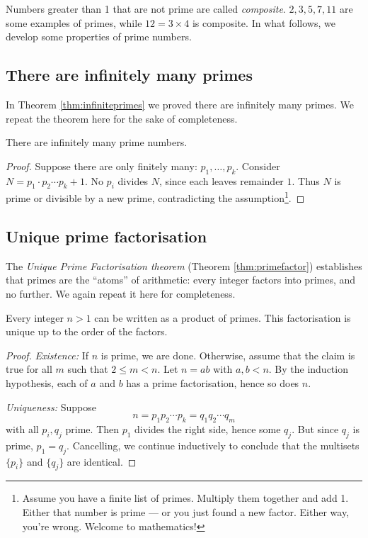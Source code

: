 Numbers greater than 1 that are not prime are called \emph{composite}.  
$2,3,5,7,11$ are some examples of primes, while $12=3 \times 4$ is composite.  In what follows, we develop some properties of prime numbers.

\subsection{There are infinitely many primes}

In Theorem \ref{thm:infiniteprimes} we proved there are infinitely many primes. We repeat the theorem here for the sake of completeness.

\begin{theorem}[Euclid]
There are infinitely many prime numbers.
\end{theorem}
\begin{proof}
Suppose there are only finitely many: $p_1,\dots,p_k$. 
Consider $N=p_1\cdot p_2\cdots p_k+1$. 
No $p_i$ divides $N$, since each leaves remainder $1$. 
Thus $N$ is prime or divisible by a new prime, contradicting the assumption\footnote{Assume you have a finite list of primes. Multiply them together and add 1. Either that number is prime — or you just found a new factor. Either way, you’re wrong. Welcome to mathematics!}. 
\end{proof}
\vspace{2mm}

\subsection{Unique prime factorisation}

The  \emph{Unique Prime Factorisation theorem}  (Theorem \ref{thm:primefactor}) establishes that primes are the ``atoms'' of arithmetic: every integer factors into primes, and no further. We again repeat it here for completeness.
\begin{theorem}
Every integer $n>1$ can be written as a product of primes. 
This factorisation is unique up to the order of the factors.
\end{theorem}
\begin{proof}
\emph{Existence:} If $n$ is prime, we are done. Otherwise, assume that the claim is true for all $m$ such that $2 \leq m < n$. Let  $n=ab$ with $a,b<n$. By the induction hypothesis, each of $a$ and $b$ has a prime factorisation, hence so does $n$.

\emph{Uniqueness:} Suppose
\[
n = p_1p_2\cdots p_k = q_1q_2\cdots q_m
\]
with all $p_i, q_j$ prime. Then $p_1$ divides the right side, hence some $q_j$. But since $q_j$ is prime, $p_1=q_j$. Cancelling, we continue inductively to conclude that the multisets $\{p_i\}$ and $\{q_j\}$ are identical.
\end{proof}

